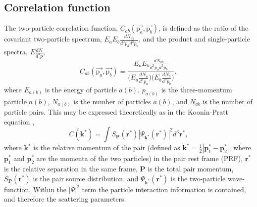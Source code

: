 \documentclass[ALICE,manyauthors]{cernphprep}
\begin{document}
\subsection{Correlation function}
\label{sec:CorrelationFunction}
The two-particle correlation function, $C_{ab}(\vec{\mathrm{p}_{a}},\vec{\mathrm{p}_{b}})$, is defined as the ratio of the covariant two-particle spectrum, $E_{a}E_{b}\frac{dN_{ab}}{d^{3}p_{a}d^{3}p_{b}}$, and the product and single-particle spectra, $E\frac{dN}{d^{3}p}$,
\begin{equation}
  C_{ab}(\vec{\mathrm{p}_{a}},\vec{\mathrm{p}_{b}}) = \frac{E_{a}E_{b}\frac{dN_{ab}}{d^{3}p_{a}d^{3}p_{b}}}{\big( E_{a}\frac{dN_{a}}{d^{3}p_{a}} \big) \big( E_{b}\frac{dN_{b}}{d^{3}p_{b}} \big)},
\label{eqn:CfRatioSpectra}
\end{equation}
where $E_{a(b)}$ is the energy of particle $a(b)$, $p_{a(b)}$ is the three-momentum particle $a(b)$, $N_{a(b)}$ is the number of particles $a(b)$, and $N_{ab}$ is the number of particle pairs.
This may be expressed theoretically as in the Koonin-Pratt equation \cite{Koonin:1977fh, Pratt:1990zq},
\begin{equation}
 C(\mathbf{k^{*}}) = \int S_{\mathbf{P}}(\mathbf{r^{*}})|\Psi_{\mathbf{k^{*}}}(\mathbf{r^{*}})|^{2}d^{3}\mathbf{r^{*}},
\label{eqn:KooninPrattEqn}
\end{equation}
where $\mathbf{k}^{*}$ is the relative momentum of the pair (defined as $\mathbf{k}^{*} = \frac{1}{2}|\mathbf{p}_{1}^{*}-\mathbf{p}_{2}^{*}|$, where $\mathbf{p}_{1}^{*}$ and $\mathbf{p}_{2}^{*}$ are the momenta of the two particles) in the pair rest frame (PRF), $\mathbf{r}^{*}$ is the relative separation in the same frame, $\mathbf{P}$ is the total pair momentum, $S_{\mathbf{P}}(\mathbf{r^{*}})$ is the pair source distribution, and $\Psi_{\mathbf{k^{*}}}(\mathbf{r^{*}})$ is the two-particle wave-function.
Within the $|\Psi|^{2}$ term the particle interaction information is contained, and therefore the scattering parameters.
\end{document}
